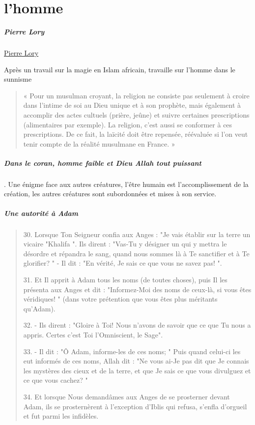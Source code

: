 \chapter{l'homme}


\paragraph{Pierre Lory}
\href{https://fr.wikipedia.org/wiki/Pierre_Lory}{Pierre Lory}

Après un travail sur la magie en Islam africain, travaille sur l'homme dans le sunnisme 
\begin{quote}
    « Pour un musulman croyant, la religion ne consiste pas seulement à croire dans l’intime de soi au Dieu unique et à son prophète, mais également à accomplir des actes cultuels (prière, jeûne) et suivre certaines prescriptions (alimentaires par exemple). La religion, c’est aussi se conformer à ces prescriptions. De ce fait, la laïcité doit être repensée, réévaluée si l’on veut tenir compte de la réalité musulmane en France. »
\end{quote}
\paragraph{Dans le coran, homme faible et Dieu Allah tout puissant}. Une énigme face aux autres créatures, l'être humain est l'accomplissement de la création, les autres créatures sont subordonnées et mises à son service.

\paragraph{Une autorité à Adam}

\begin{quote}
    30. Lorsque Ton Seigneur confia aux Anges : "Je vais établir sur la terre un vicaire "Khalifa ". Ils dirent : "Vas-Tu y désigner un qui y mettra le désordre et répandra le sang, quand nous sommes là à Te sanctifier et à Te glorifier? " - Il dit : "En vérité, Je sais ce que vous ne savez pas! ".

31. Et Il apprit à Adam tous les noms (de toutes choses), puis Il les présenta aux Anges et dit : "Informez-Moi des noms de ceux-là, si vous êtes véridiques! " (dans votre prétention que vous êtes plus méritants qu'Adam).

32. - Ils dirent : "Gloire à Toi! Nous n'avons de savoir que ce que Tu nous a appris. Certes c'est Toi l'Omniscient, le Sage".

33. - Il dit : "Ô Adam, informe-les de ces noms; " Puis quand celui-ci les eut informés de ces noms, Allah dit : "Ne vous ai-Je pas dit que Je connais les mystères des cieux et de la terre, et que Je sais ce que vous divulguez et ce que vous cachez? "

34. Et lorsque Nous demandâmes aux Anges de se prosterner devant Adam, ils se prosternèrent à l'exception d'Iblis qui refusa, s'enfla d'orgueil et fut parmi les infidèles.

\end{quote}

